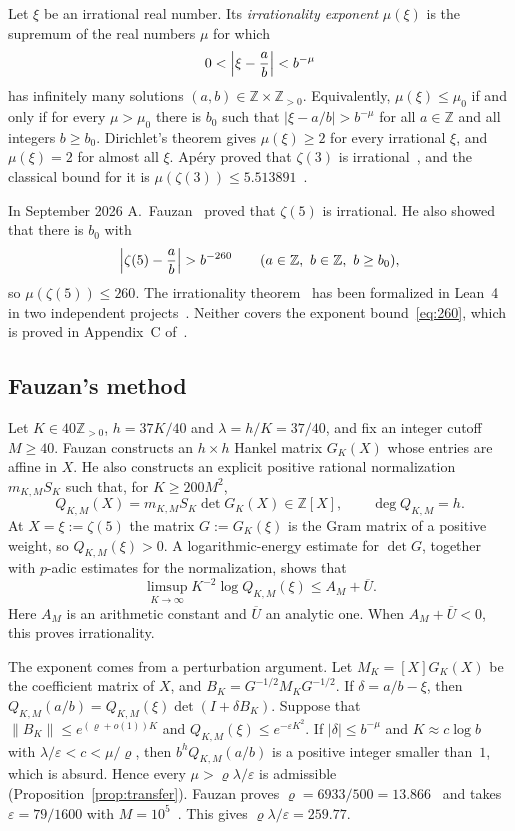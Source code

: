 \documentclass[11pt]{article}
\theoremstyle{remark}
\newcommand{\Z}{\mathbb{Z}}
\newcommand{\Ubar}{\overline{U}}
\begin{document}
Let $\xi$ be an irrational real number. Its \emph{irrationality exponent} $\mu(\xi)$ is the supremum of the real numbers $\mu$ for which
\[
0<\Bigl|\xi-\frac ab\Bigr|<b^{-\mu}
\]
has infinitely many solutions $(a,b)\in\Z\times\Z_{>0}$. Equivalently, $\mu(\xi)\le\mu_0$ if and only if for every $\mu>\mu_0$ there is $b_0$ such that $|\xi-a/b|>b^{-\mu}$ for all $a\in\Z$ and all integers $b\ge b_0$. Dirichlet's theorem gives $\mu(\xi)\ge2$ for every irrational $\xi$, and $\mu(\xi)=2$ for almost all $\xi$. Ap\'ery proved that $\zeta(3)$ is irrational~\cite{Ap}, and the classical bound for it is $\mu(\zeta(3))\le5.513891$~\cite{RV}.

In September 2026 A.~Fauzan~\cite{F} proved that $\zeta(5)$ is irrational. He also showed~\cite[Cor.~1.2]{F} that there is $b_0$ with
\begin{equation}\label{eq:260}
\Bigl|\zeta(5)-\frac ab\Bigr|>b^{-260}\qquad(a\in\Z,\ b\in\Z,\ b\ge b_0),
\end{equation}
so $\mu(\zeta(5))\le260$. The irrationality theorem~\cite[Thm.~1.1]{F} has been formalized in Lean~4 in two independent projects~\cite{DR,Mo}. Neither covers the exponent bound~\eqref{eq:260}, which is proved in Appendix~C of~\cite{F}.

\subsection{Fauzan's method}

Let $K\in40\Z_{>0}$, $h=37K/40$ and $\lambda=h/K=37/40$, and fix an integer cutoff $M\ge40$. Fauzan constructs an $h\times h$ Hankel matrix $G_K(X)$ whose entries are affine in $X$. He also constructs an explicit positive rational normalization $m_{K,M}S_K$ such that, for $K\ge200M^2$,
\[
Q_{K,M}(X)=m_{K,M}S_K\det G_K(X)\in\Z[X],\qquad\deg Q_{K,M}=h .
\]
At $X=\xi:=\zeta(5)$ the matrix $G:=G_K(\xi)$ is the Gram matrix of a positive weight, so $Q_{K,M}(\xi)>0$. A logarithmic-energy estimate for $\det G$, together with $p$-adic estimates for the normalization, shows that
\begin{equation}\label{eq:decay-intro}
\limsup_{K\to\infty}K^{-2}\log Q_{K,M}(\xi)\le A_M+\Ubar .
\end{equation}
Here $A_M$ is an arithmetic constant and $\Ubar$ an analytic one. When $A_M+\Ubar<0$, this proves irrationality.

The exponent comes from a perturbation argument. Let $M_K=[X]G_K(X)$ be the coefficient matrix of $X$, and $B_K=G^{-1/2}M_KG^{-1/2}$. If $\delta=a/b-\xi$, then $Q_{K,M}(a/b)=Q_{K,M}(\xi)\det(I+\delta B_K)$. Suppose that $\|B_K\|\le e^{(\varrho+o(1))K}$ and $Q_{K,M}(\xi)\le e^{-\varepsilon K^2}$. If $|\delta|\le b^{-\mu}$ and $K\approx c\log b$ with $\lambda/\varepsilon<c<\mu/\varrho$, then $b^hQ_{K,M}(a/b)$ is a positive integer smaller than~$1$, which is absurd. Hence every $\mu>\varrho\lambda/\varepsilon$ is admissible (Proposition~\ref{prop:transfer}). Fauzan proves $\varrho=6933/500=13.866$~\cite[Prop.~C.1]{F} and takes $\varepsilon=79/1600$ with $M=10^5$~\cite[(C.7)]{F}. This gives $\varrho\lambda/\varepsilon=259.77$.
\end{document}

